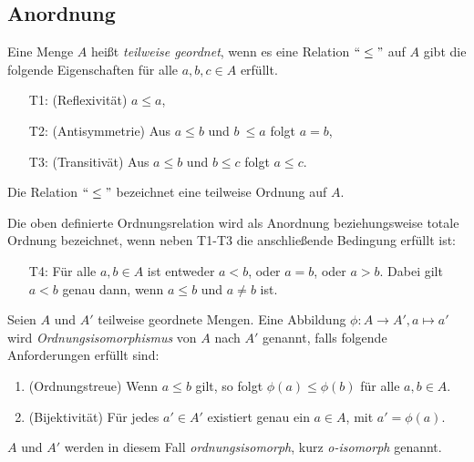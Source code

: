 \subsection{Anordnung}
\begin{defn}\label{defgs} 
Eine Menge $A$ heißt \textit{teilweise geordnet}, wenn es eine Relation $``\leq " $ auf $A$ gibt die folgende Eigenschaften für alle $ a,b,c \in A$  erfüllt.
%
\begin{enumerate}
\item[T1:] (Reflexivität)  $a \leq  a$,
\item[T2:] (Antisymmetrie)  Aus $a \leq  b$ und $b~ \leq a$ folgt $a = b$,
\item[T3:] (Transitivät) Aus $a \leq b$ und $b \leq c$ folgt $a \leq c$.
\end{enumerate}
%
Die Relation $``\leq "$ bezeichnet eine teilweise Ordnung auf $A$.
\end{defn}
Die oben definierte Ordnungsrelation wird als Anordnung beziehungsweise totale Ordnung bezeichnet, wenn neben T1-T3 die anschließende Bedingung erfüllt ist:
%
\begin{enumerate}
\item[T4:] Für alle $a, b \in A$ ist entweder $a < b$, oder $a = b$, oder $a > b$. Dabei gilt $a < b$ genau dann, wenn $a \leq b$ und $a\neq b$ ist. 
\end{enumerate}
%
%
%
%
%
%
%
\begin{defn}\label{ordnungsisomorph}
Seien $A$ und $A'$ teilweise geordnete Mengen. Eine Abbildung $\phi \colon A \rightarrow A', a \mapsto a'$ wird \textit{Ordnungsisomorphismus} von $A$ nach $A'$ genannt, falls folgende Anforderungen erfüllt sind:
\begin{enumerate}
\item (Ordnungstreue) Wenn $a \leq b$ gilt, so folgt $\phi(a) \leq \phi(b)$ für alle $a, b  \in A$.
\item (Bijektivität) Für jedes $a' \in A'$ existiert genau ein $a \in A$, mit $a' = \phi(a)$.
\end{enumerate}
$A$ und $A'$ werden in diesem Fall \textit{ordnungsisomorph}, kurz \textit{o-isomorph} genannt.
\end{defn}
